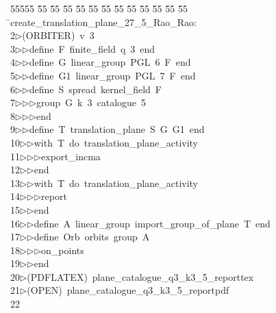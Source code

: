%
%
\begin{tabbing}
55555 \= 55 \= 55 \= 55 \= 55 \= 55 \= 55 \= 55 \= 55 \= 55 \= 55 \= 55 \= 55 \= \>create\_translation\_plane\_27\_5\_Rao\_Rao:\\[0pt]
2\>$\triangleright$\>(ORBITER)\ v\ 3\ \\[0pt]
3\>$\triangleright$\>$\triangleright$\>define\ F\ finite\_field\ q\ 3\ end\ \\[0pt]
4\>$\triangleright$\>$\triangleright$\>define\ G\ linear\_group\ PGL\ 6\ F\ end\ \\[0pt]
5\>$\triangleright$\>$\triangleright$\>define\ G1\ linear\_group\ PGL\ 7\ F\ end\ \\[0pt]
6\>$\triangleright$\>$\triangleright$\>define\ S\ spread\ kernel\_field\ F\ \\[0pt]
7\>$\triangleright$\>$\triangleright$\>$\triangleright$\>group\ G\ k\ 3\ catalogue\ 5\ \\[0pt]
8\>$\triangleright$\>$\triangleright$\>$\triangleright$\>end\ \\[0pt]
9\>$\triangleright$\>$\triangleright$\>define\ T\ translation\_plane\ S\ G\ G1\ end\ \\[0pt]
10\>$\triangleright$\>$\triangleright$\>with\ T\ do\ translation\_plane\_activity\ \\[0pt]
11\>$\triangleright$\>$\triangleright$\>$\triangleright$\>export\_incma\ \\[0pt]
12\>$\triangleright$\>$\triangleright$\>end\ \\[0pt]
13\>$\triangleright$\>$\triangleright$\>with\ T\ do\ translation\_plane\_activity\ \\[0pt]
14\>$\triangleright$\>$\triangleright$\>$\triangleright$\>report\ \\[0pt]
15\>$\triangleright$\>$\triangleright$\>end\ \\[0pt]
16\>$\triangleright$\>$\triangleright$\>define\ A\ linear\_group\ import\_group\_of\_plane\ T\ end\ \\[0pt]
17\>$\triangleright$\>$\triangleright$\>define\ Orb\ orbits\ group\ A\ \\[0pt]
18\>$\triangleright$\>$\triangleright$\>$\triangleright$\>on\_points\ \\[0pt]
19\>$\triangleright$\>$\triangleright$\>end\\[0pt]
20\>$\triangleright$\>(PDFLATEX)\ plane\_catalogue\_q3\_k3\_5\_reporttex\\[0pt]
21\>$\triangleright$\>(OPEN)\ plane\_catalogue\_q3\_k3\_5\_reportpdf\\[0pt]
22\>\end{tabbing}
